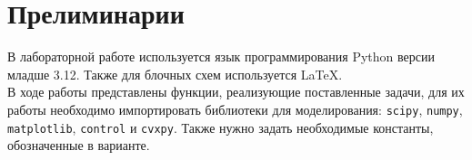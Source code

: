 \documentclass[a4paper,16pt]{article}
\begin{document}
\thispagestyle{firstpagestyle} 

\clearpage
\begingroup
\pagestyle{empty}       %
\tableofcontents
\thispagestyle{empty}   %
\endgroup
\clearpage
\setcounter{page}{1}
\pagestyle{style}

\section*{Прелиминарии}
\begin{center}
        \begin{minipage}{0.85\textwidth}
    \begin{centerblueblock}
        В лабораторной работе используется язык программирования Python версии младше 3.12. Также для блочных схем используется \LaTeX. \\В ходе работы представлены функции, реализующие поставленные задачи, для их работы необходимо импортировать библиотеки для моделирования: \texttt{scipy}, \texttt{numpy}, \texttt{matplotlib}, \texttt{control} и \texttt{cvxpy}. Также нужно задать необходимые константы, обозначенные в варианте.
\end{centerblueblock}
    \end{minipage}
\end{center}

\newpage

\newpage

\end{document}
